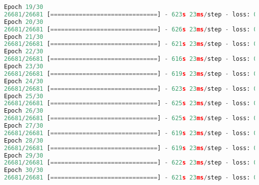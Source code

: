 \begin{lstlisting}[language=Python, caption=Full result of the CNN model]
Epoch 19/30
26681/26681 [==============================] - 623s 23ms/step - loss: 0.0720 - acc: 0.9741 - val_loss: 0.0647 - val_acc: 0.9777
Epoch 20/30
26681/26681 [==============================] - 626s 23ms/step - loss: 0.0703 - acc: 0.9759 - val_loss: 0.0798 - val_acc: 0.9711
Epoch 21/30
26681/26681 [==============================] - 621s 23ms/step - loss: 0.0633 - acc: 0.9780 - val_loss: 0.0646 - val_acc: 0.9760
Epoch 22/30
26681/26681 [==============================] - 616s 23ms/step - loss: 0.0628 - acc: 0.9774 - val_loss: 0.0558 - val_acc: 0.9815
Epoch 23/30
26681/26681 [==============================] - 619s 23ms/step - loss: 0.0601 - acc: 0.9789 - val_loss: 0.0746 - val_acc: 0.9750
Epoch 24/30
26681/26681 [==============================] - 623s 23ms/step - loss: 0.0630 - acc: 0.9778 - val_loss: 0.0738 - val_acc: 0.9762
Epoch 25/30
26681/26681 [==============================] - 625s 23ms/step - loss: 0.0572 - acc: 0.9799 - val_loss: 0.0511 - val_acc: 0.9835
Epoch 26/30
26681/26681 [==============================] - 625s 23ms/step - loss: 0.0517 - acc: 0.9828 - val_loss: 0.0480 - val_acc: 0.9835
Epoch 27/30
26681/26681 [==============================] - 619s 23ms/step - loss: 0.0500 - acc: 0.9824 - val_loss: 0.0583 - val_acc: 0.9789
Epoch 28/30
26681/26681 [==============================] - 619s 23ms/step - loss: 0.0497 - acc: 0.9824 - val_loss: 0.0607 - val_acc: 0.9785
Epoch 29/30
26681/26681 [==============================] - 622s 23ms/step - loss: 0.0490 - acc: 0.9831 - val_loss: 0.0423 - val_acc: 0.9853
Epoch 30/30
26681/26681 [==============================] - 621s 23ms/step - loss: 0.0460 - acc: 0.9838 - val_loss: 0.0452 - val_acc: 0.9850


\end{lstlisting}
